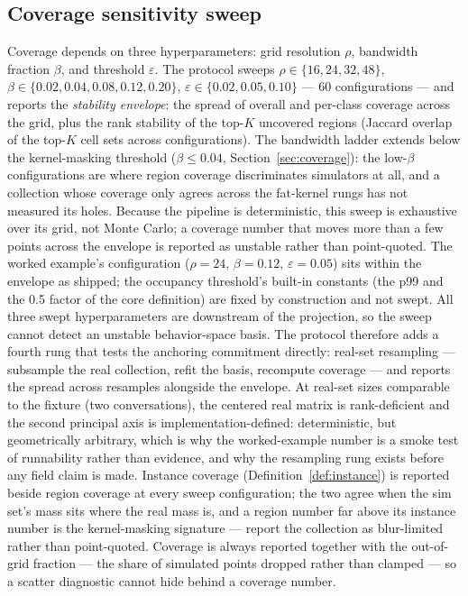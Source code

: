 \subsection{Coverage sensitivity sweep}
Coverage depends on three hyperparameters: grid resolution $\rho$, bandwidth fraction
$\beta$, and threshold $\varepsilon$.
The protocol sweeps
$\rho \in \{16, 24, 32, 48\}$,
$\beta \in \{0.02, 0.04, 0.08, 0.12, 0.20\}$,
$\varepsilon \in \{0.02, 0.05, 0.10\}$
--- 60 configurations --- and reports the \emph{stability envelope}: the spread of overall
and per-class coverage across the grid, plus the rank stability of the top-$K$ uncovered
regions (Jaccard overlap of the top-$K$ cell sets across configurations).
The bandwidth ladder extends below the kernel-masking threshold ($\beta \le 0.04$,
Section~\ref{sec:coverage}): the low-$\beta$ configurations are where region coverage
discriminates simulators at all, and a collection whose coverage only agrees across the
fat-kernel rungs has not measured its holes.
Because the pipeline is deterministic, this sweep is exhaustive over its grid, not Monte
Carlo; a coverage number that moves more than a few points across the envelope is reported as
unstable rather than point-quoted.
The worked example's configuration ($\rho{=}24$, $\beta{=}0.12$, $\varepsilon{=}0.05$) sits
within the envelope as shipped; the occupancy threshold's built-in constants (the p99 and the
0.5 factor of the core definition) are fixed by construction and not swept.
All three swept hyperparameters are downstream of the projection, so the sweep cannot detect
an unstable behavior-space basis.
The protocol therefore adds a fourth rung that tests the anchoring commitment directly:
real-set resampling --- subsample the real collection, refit the basis, recompute coverage
--- and reports the spread across resamples alongside the envelope.
At real-set sizes comparable to the fixture (two conversations), the centered real matrix is
rank-deficient and the second principal axis is implementation-defined: deterministic, but
geometrically arbitrary, which is why the worked-example number is a smoke test of runnability
rather than evidence, and why the resampling rung exists before any field claim is made.
Instance coverage (Definition~\ref{def:instance}) is reported beside region coverage at every
sweep configuration; the two agree when the sim set's mass sits where the real mass is, and
a region number far above its instance number is the kernel-masking signature — report the
collection as blur-limited rather than point-quoted.
Coverage is always reported together with the out-of-grid fraction --- the share of simulated
points dropped rather than clamped --- so a scatter diagnostic cannot hide behind a coverage
number.

